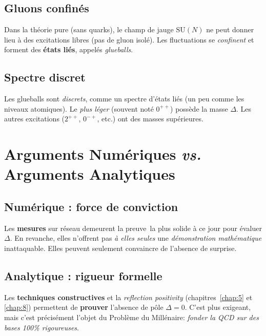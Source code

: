 \subsection*{Gluons confinés}
Dans la théorie pure (sans quarks), le champ de jauge \(\mathrm{SU}(N)\) ne peut donner lieu à des excitations libres (pas de gluon isolé). Les fluctuations se \emph{confinent} et forment des \textbf{états liés}, appelés \emph{glueballs}.  

\subsection*{Spectre discret}
Les glueballs sont \emph{discrets}, comme un spectre d’états liés (un peu comme les niveaux atomiques). Le \emph{plus léger} (souvent noté \(0^{++}\)) possède la masse \(\Delta\). Les autres excitations (\(2^{++}\), \(0^{-+}\), etc.) ont des masses supérieures.

\vspace{1em}

\section{Arguments Numériques \textit{vs.} Arguments Analytiques}
\label{sec:10.3}

\subsection*{Numérique : force de conviction}
Les \textbf{mesures} sur réseau demeurent la \og preuve\fg\ la plus solide à ce jour pour évaluer \(\Delta\). En revanche, elles n’offrent pas \textit{à elles seules} une \emph{démonstration mathématique} inattaquable. Elles peuvent seulement convaincre de l’absence de surprise.

\subsection*{Analytique : rigueur formelle}
Les \textbf{techniques constructives} et la \emph{reflection positivity} (chapitres~\ref{chap:5} et \ref{chap:8}) permettent de \textbf{prouver} l’absence de pôle \(\Delta=0\). C’est plus exigeant, mais c’est précisément l’objet du \og Problème du Millénaire\fg : \emph{fonder la QCD sur des bases 100\% rigoureuses}.

